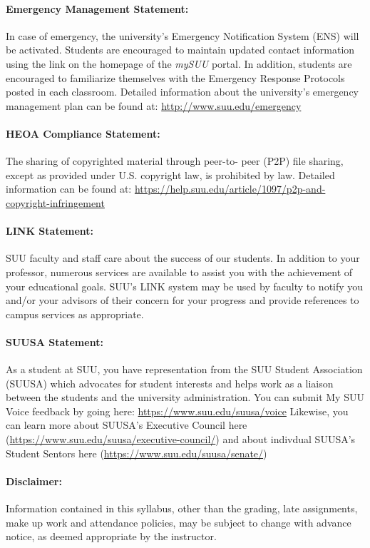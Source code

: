 \documentclass[12pt, letterpaper]{article}
\begin{document}
\paragraph{Emergency Management Statement:}
In case of emergency, the university's Emergency Notification System (ENS) will be activated. Students are encouraged to maintain updated contact information using the link on the homepage of the \emph{mySUU} portal. In addition, students are encouraged to familiarize themselves with the Emergency Response Protocols posted in each classroom. Detailed information about the university's emergency management plan can be found at: \href{http://www.suu.edu/emergency}{http://www.suu.edu/emergency}

\paragraph{HEOA Compliance Statement:}
The sharing of copyrighted material through peer-to- peer (P2P) file sharing, except as provided under U.S. copyright law, is prohibited by law. Detailed information can be found at: \href{https://help.suu.edu/article/1097/p2p-and-copyright-infringement}{https://help.suu.edu/article/1097/p2p-and-copyright-infringement}

\paragraph{LINK Statement:}
SUU faculty and staff care about the success of our students. In addition to your professor, numerous services are available to assist you with the achievement of your educational goals. SUU's LINK system may be used by faculty to notify you and/or your advisors of their concern for your progress and provide references to campus services as appropriate.

\paragraph{SUUSA Statement:}
As a student at SUU, you have representation from the SUU Student Association (SUUSA) which advocates for student interests and helps work as a liaison between the students and the university administration. You can submit My SUU Voice feedback by going here: \href{https://www.suu.edu/suusa/voice}{https://www.suu.edu/suusa/voice} Likewise, you can learn more about SUUSA's Executive Council here (\href{https://www.suu.edu/suusa/executive-council/}{https://www.suu.edu/suusa/executive-council/}) and about indivdual SUUSA's Student Sentors here (\href{https://www.suu.edu/suusa/senate/}{https://www.suu.edu/suusa/senate/})

\paragraph{Disclaimer:}
Information contained in this syllabus, other than the grading, late assignments, make up work and attendance policies, may be subject to change with advance notice, as deemed appropriate by the instructor.
\end{document}
